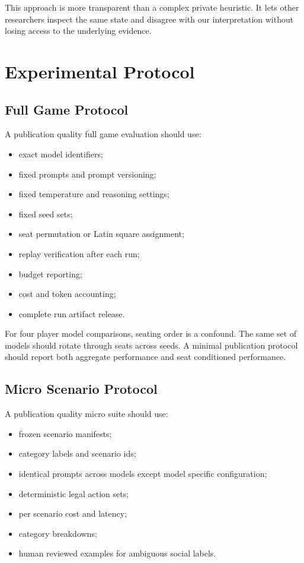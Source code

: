 \documentclass[conference]{IEEEtran}
\begin{document}
This approach is more transparent than a complex private heuristic. It lets other researchers inspect the same state and disagree with our interpretation without losing access to the underlying evidence.

\section{Experimental Protocol}
\label{sec:protocol}

\subsection{Full Game Protocol}

A publication quality full game evaluation should use:

\begin{itemize}
    \item exact model identifiers;
    \item fixed prompts and prompt versioning;
    \item fixed temperature and reasoning settings;
    \item fixed seed sets;
    \item seat permutation or Latin square assignment;
    \item replay verification after each run;
    \item budget reporting;
    \item cost and token accounting;
    \item complete run artifact release.
\end{itemize}

For four player model comparisons, seating order is a confound. The same set of models should rotate through seats across seeds. A minimal publication protocol should report both aggregate performance and seat conditioned performance.

\subsection{Micro Scenario Protocol}

A publication quality micro suite should use:

\begin{itemize}
    \item frozen scenario manifests;
    \item category labels and scenario ids;
    \item identical prompts across models except model specific configuration;
    \item deterministic legal action sets;
    \item per scenario cost and latency;
    \item category breakdowns;
    \item human reviewed examples for ambiguous social labels.
\end{itemize}
\end{document}
